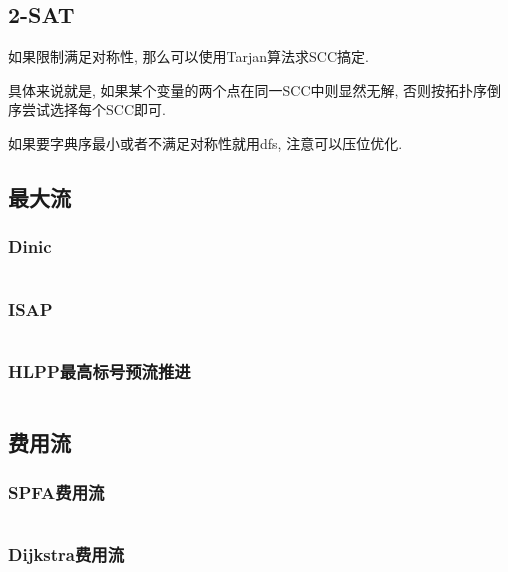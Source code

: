 \documentclass[a4paper]{article}
\begin{document}
\begin{multicols}{2}
			
			

			\subsection{2-SAT}
				如果限制满足对称性, 那么可以使用Tarjan算法求SCC搞定. 
				
				具体来说就是, 如果某个变量的两个点在同一SCC中则显然无解, 否则按拓扑序倒序尝试选择每个SCC即可.

				如果要字典序最小或者不满足对称性就用dfs, 注意可以压位优化.


			\subsection{最大流}
				\subsubsection{Dinic}
					\inputminted{cpp}{../src/graph/Dinic.cpp}

				\subsubsection{ISAP}
					\inputminted{cpp}{../src/graph/ISAP.cpp}

				\subsubsection{HLPP最高标号预流推进}
					\inputminted{cpp}{../src/graph/HLPP.cpp}
			
			\subsection{费用流}
				\subsubsection{SPFA费用流}
					\inputminted{cpp}{../src/graph/SPFA费用流.cpp}

				\subsubsection{Dijkstra费用流}
					

			


\end{multicols}
\end{document}
